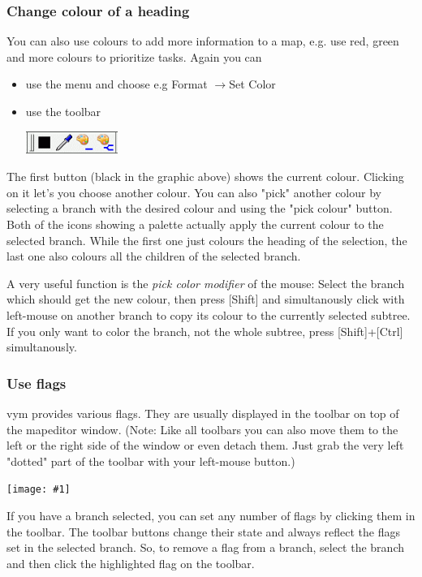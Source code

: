 \documentclass[12pt,a4paper]{article}
\newcommand{\maximage}[1]{  
    \begin{center}
        \texttt{[image: \#1]} 
    \end{center}
}
\newcommand{\vym}{{\sc vym }}
\newcommand{\ra}{$\longrightarrow$}
\newcommand{\key}[1]{[#1]}
\begin{document}
\subsubsection*{Change colour of a heading}
You can also use colours to add more information to a map, e.g. use
red, green and more colours to prioritize tasks. Again you can
\begin{itemize}
    \item use the menu and choose e.g Format \ra Set Color
    \item use the toolbar
        \begin{center}
            \includegraphics[width=3cm]{images/color-buttons.png}
        \end{center}    
\end{itemize}
The first button (black in the graphic above) shows the current colour.
Clicking on it let's you choose another colour. You can also "pick"
another colour by selecting a branch with the desired colour and using
the "pick colour" button. Both of the icons showing a palette actually
apply the current colour to the selected branch. While the first one
just colours the heading of the selection, the last one also colours all
the children of the selected branch.

A very useful function is the {\em pick color modifier} of the mouse:
Select the branch which should get the new colour, then press
\key{Shift} and simultanously click with left-mouse on another branch to
copy its colour to the currently selected subtree. If you only want to
color the branch, not the whole subtree, press \key{Shift}+\key{Ctrl}
simultanously. 

\subsubsection*{Use flags}
\vym provides various flags. They are usually displayed in the toolbar
on top of the mapeditor window. (Note: Like all toolbars you can also
move them to the left or the right side of the window or even detach
them. Just grab the very left "dotted" part of the toolbar with your
left-mouse button.) 
\maximage{images/default-flags.png} 
If you have a branch selected, you can set any number of flags by
clicking them in the toolbar. The toolbar buttons change their state and
always reflect the flags set in the selected branch. So, to remove a
flag from a branch, select the branch and then click the highlighted
flag on the toolbar.
\end{document}
